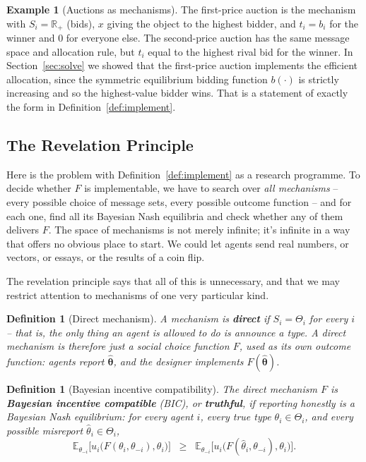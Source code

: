 \documentclass[12pt]{article}
\newcommand{\bbR}{\mathbb{R}}
\newcommand{\bbE}{\mathbb{E}}
\newtheorem{definition}[theorem]{Definition}
\theoremstyle{definition}
\newtheorem{example}[theorem]{Example}
\theoremstyle{remark}
\theoremstyle{plain}                          %
\newcommand{\Th}{\Theta}
\newcommand{\tv}{\boldsymbol{\theta}}
\begin{document}
\begin{example}[Auctions as mechanisms]
The first-price auction is the mechanism with $S_i = \bbR_+$ (bids), $x$ giving the object to the highest bidder, and $t_i = b_i$ for the winner and $0$ for everyone else. The second-price auction has the same message space and allocation rule, but $t_i$ equal to the highest rival bid for the winner. In Section~\ref{sec:solve} we showed that the first-price auction implements the efficient allocation, since the symmetric equilibrium bidding function $b(\cdot)$ is strictly increasing and so the highest-value bidder wins. That is a statement of exactly the form in Definition~\ref{def:implement}.
\end{example}
 
\subsection{The Revelation Principle}\label{sec:revelation}
 
Here is the problem with Definition~\ref{def:implement} as a research programme. To decide whether $F$ is implementable, we have to search over \emph{all mechanisms} -- every possible choice of message sets, every possible outcome function -- and for each one, find all its Bayesian Nash equilibria and check whether any of them delivers $F$. The space of mechanisms is not merely infinite; it's infinite in a way that offers no obvious place to start. We could let agents send real numbers, or vectors, or essays, or the results of a coin flip.
 
The revelation principle says that all of this is unnecessary, and that we may restrict attention to mechanisms of one very particular kind.
 
\begin{definition}[Direct mechanism]
A mechanism is \textbf{direct} if $S_i = \Th_i$ for every $i$ -- that is, the only thing an agent is allowed to do is announce a type. A direct mechanism is therefore just a social choice function $F$, used as its own outcome function: agents report $\hat{\tv}$, and the designer implements $F(\hat{\tv})$.
\end{definition}
 
\begin{definition}[Bayesian incentive compatibility]\label{def:bic}
The direct mechanism $F$ is \textbf{Bayesian incentive compatible} (BIC), or \textbf{truthful}, if reporting honestly is a Bayesian Nash equilibrium: for every agent $i$, every true type $\theta_i \in \Th_i$, and every possible misreport $\hat\theta_i \in \Th_i$,
\[
    \bbE_{\theta_{-i}}\Big[u_i\big(F(\theta_i,\theta_{-i}),\theta_i\big)\Big]
    \;\;\geq\;\;
    \bbE_{\theta_{-i}}\Big[u_i\big(F(\hat\theta_i,\theta_{-i}),\theta_i\big)\Big].
\]
\end{definition}
 
\end{document}
